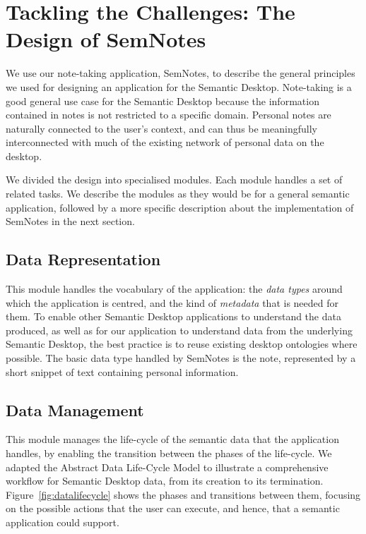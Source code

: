 \section{Tackling the Challenges: The Design of SemNotes}
\label{sec:semnotesdesign}

We use our note-taking application, SemNotes, to describe the general principles we used for designing an application for the Semantic Desktop. Note-taking is a good general use case for the Semantic Desktop because the information contained in notes is not restricted to a specific domain. Personal notes are naturally connected to the user's context, and can thus be meaningfully interconnected with much of the existing network of personal data on the desktop.

We divided the design into specialised modules. Each module handles a set of related tasks. We describe the modules as they would be for a general semantic application, followed by a more specific description about the implementation of SemNotes in the next section.
 
\subsection{Data Representation} 

This module handles the vocabulary of the application: the \emph{data types} around which the application is centred, and the kind of \emph{metadata} that is needed for them. To enable other Semantic Desktop applications to understand the data produced, as well as for our application to understand data from the underlying Semantic Desktop, the best practice is to reuse existing desktop ontologies where possible. The basic data type handled by SemNotes is the note, represented by a short snippet of text containing personal information. 

\subsection{Data Management} 

This module manages the life-cycle of the semantic data that the application handles, by enabling the transition between the phases of the life-cycle. We adapted the Abstract Data Life-Cycle Model \cite{MoellerPhDThesis2009} to illustrate a comprehensive workflow for Semantic Desktop data, from its creation to its termination. Figure~\ref{fig:datalifecycle} shows the phases and transitions between them, focusing on the possible actions that the user can execute, and hence, that a semantic application could support.

